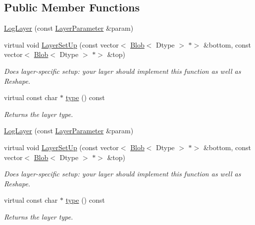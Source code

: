 \subsection*{Public Member Functions}
\begin{DoxyCompactItemize}
\item 
\mbox{\hyperlink{classcaffe_1_1_log_layer_aa6f92a0b12140d70a44a2bcb71bab552}{Log\+Layer}} (const \mbox{\hyperlink{classcaffe_1_1_layer_parameter}{Layer\+Parameter}} \&param)
\item 
virtual void \mbox{\hyperlink{classcaffe_1_1_log_layer_a87e062000908b474ac4cda3b2f3c6f1e}{Layer\+Set\+Up}} (const vector$<$ \mbox{\hyperlink{classcaffe_1_1_blob}{Blob}}$<$ Dtype $>$ $\ast$$>$ \&bottom, const vector$<$ \mbox{\hyperlink{classcaffe_1_1_blob}{Blob}}$<$ Dtype $>$ $\ast$$>$ \&top)
\begin{DoxyCompactList}\small\item\em Does layer-\/specific setup\+: your layer should implement this function as well as Reshape. \end{DoxyCompactList}\item 
\mbox{\label{classcaffe_1_1_log_layer_aec4c7354215da16156bdc3c966ba311f}} 
virtual const char $\ast$ \mbox{\hyperlink{classcaffe_1_1_log_layer_aec4c7354215da16156bdc3c966ba311f}{type}} () const
\begin{DoxyCompactList}\small\item\em Returns the layer type. \end{DoxyCompactList}\item 
\mbox{\hyperlink{classcaffe_1_1_log_layer_aa6f92a0b12140d70a44a2bcb71bab552}{Log\+Layer}} (const \mbox{\hyperlink{classcaffe_1_1_layer_parameter}{Layer\+Parameter}} \&param)
\item 
virtual void \mbox{\hyperlink{classcaffe_1_1_log_layer_aa73d4cdfc38059902ffa2258d58e1dd4}{Layer\+Set\+Up}} (const vector$<$ \mbox{\hyperlink{classcaffe_1_1_blob}{Blob}}$<$ Dtype $>$ $\ast$$>$ \&bottom, const vector$<$ \mbox{\hyperlink{classcaffe_1_1_blob}{Blob}}$<$ Dtype $>$ $\ast$$>$ \&top)
\begin{DoxyCompactList}\small\item\em Does layer-\/specific setup\+: your layer should implement this function as well as Reshape. \end{DoxyCompactList}\item 
\mbox{\label{classcaffe_1_1_log_layer_aec4c7354215da16156bdc3c966ba311f}} 
virtual const char $\ast$ \mbox{\hyperlink{classcaffe_1_1_log_layer_aec4c7354215da16156bdc3c966ba311f}{type}} () const
\begin{DoxyCompactList}\small\item\em Returns the layer type. \end{DoxyCompactList}\end{DoxyCompactItemize}
